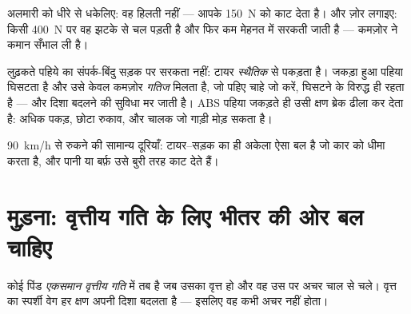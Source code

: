 \begin{example}[अलमारी को धकेलना]\label{ex:g11:forces-and-motion:wardrobe}
अलमारी को धीरे से धकेलिए: वह हिलती नहीं ---  आपके
\qty{150}{N} को काट देता है। और ज़ोर लगाइए: किसी \qty{400}{N} पर वह झटके से चल पड़ती है
और फिर कम मेहनत में सरकती जाती है --- कमज़ोर  ने कमान
सँभाल ली है।
\end{example}

\begin{remark}\label{rem:g11:forces-and-motion:abs}
लुढ़कते पहिये का संपर्क-बिंदु सड़क पर सरकता नहीं: टायर \emph{स्थैतिक}
 से पकड़ता है। जकड़ा हुआ पहिया घिसटता है और उसे केवल कमज़ोर
\emph{गतिज}  मिलता है, जो पहिए चाहे जो करें, घिसटने के विरुद्ध
ही रहता है --- और दिशा बदलने की सुविधा मर जाती है। ABS पहिया जकड़ते ही उसी
क्षण ब्रेक ढीला कर देता है: अधिक पकड़, छोटा रुकाव, और चालक जो गाड़ी मोड़
सकता है।
\end{remark}

\begin{omfigure}

{\small \qty{90}{km/h} से रुकने की सामान्य दूरियाँ: टायर--सड़क का  ही
अकेला ऐसा बल है जो कार को धीमा करता है, और पानी या बर्फ़ उसे बुरी
तरह काट देते हैं।}
\end{omfigure}

\section{मुड़ना: वृत्तीय गति के लिए भीतर की ओर बल चाहिए}

\begin{definition}[एकसमान वृत्तीय गति]\label{def:g11:forces-and-motion:ucm}
कोई पिंड \emph{एकसमान वृत्तीय गति} में तब है जब
उसका  वृत्त हो और वह उस पर अचर चाल से चले। वृत्त का स्पर्शी वेग
हर क्षण अपनी दिशा बदलता है --- इसलिए वह कभी अचर नहीं होता।
\end{definition}

